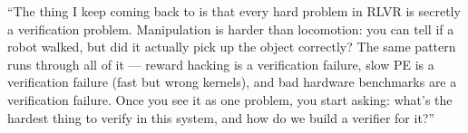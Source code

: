 \begin{sayit}
``The thing I keep coming back to is that every hard problem in RLVR is secretly a verification problem. Manipulation is harder than locomotion: you can tell if a robot walked, but did it actually pick up the object correctly? The same pattern runs through all of it --- reward hacking is a verification failure, slow PE is a verification failure (fast but wrong kernels), and bad hardware benchmarks are a verification failure. Once you see it as one problem, you start asking: what's the hardest thing to verify in this system, and how do we build a verifier for it?''
\end{sayit}

